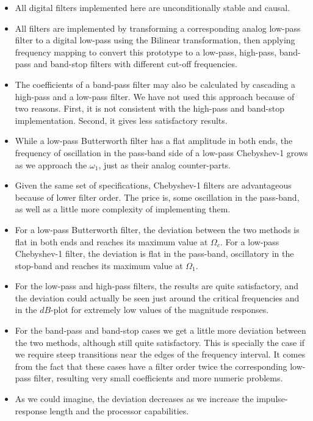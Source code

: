\documentclass{sebase}
\begin{document}
\begin{itemize}
\item All digital filters implemented here are unconditionally stable and
causal.

\item All filters are implemented by transforming a corresponding analog
low-pass filter to a digital low-pass using the Bilinear transformation,
then applying frequency mapping to convert this prototype to a low-pass,
high-pass, band-pass and band-stop filters with different cut-off
frequencies.

\item The coefficients of a band-pass filter may also be calculated by
cascading a high-pass and a low-pass filter. We have not used this approach
because of two reasons. First, it is not consistent with the high-pass and
band-stop implementation. Second, it gives less satisfactory results.

\item While a low-pass Butterworth filter has a flat amplitude in both ends,
the frequency of oscillation in the pass-band side of a low-pass Chebyshev-1
grows as we approach the $\omega _{1}$, just as their analog counter-parts.

\item Given the same set of specifications, Chebyshev-1 filters are
advantageous because of lower filter order. The price is, some oscillation
in the pass-band, as well as a little more complexity of implementing them.

\item For a low-pass Butterworth filter, the deviation between the two
methods is flat in both ends and reaches its maximum value at $\Omega _{c}$.
For a low-pass Chebyshev-1 filter, the deviation is flat in the pass-band,
oscillatory in the stop-band and reaches its maximum value at $\Omega _{1}$.

\item For the low-pass and high-pass filters, the results are quite
satisfactory, and the deviation could actually be seen just around the
critical frequencies and in the $dB$-plot for extremely low values of the
magnitude responses.

\item For the band-pass and band-stop cases we get a little more deviation
between the two methods, although still quite satisfactory. This is
specially the case if we require steep transitions near the edges of the
frequency interval. It comes from the fact that these cases have a filter
order twice the corresponding low-pass filter, resulting very small
coefficients and more numeric problems.

\item As we could imagine, the deviation decreases as we increase the
impulse-response length and the processor capabilities.
\end{itemize}
\end{document}

